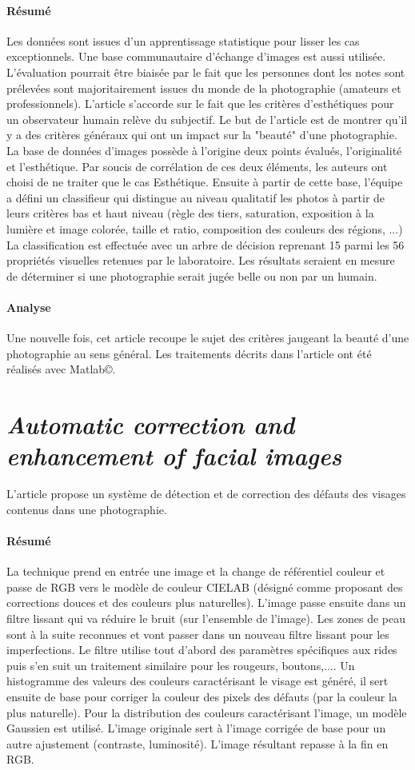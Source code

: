 \documentclass[11pt, french,screen]{report-rd-info}
\begin{document}
\paragraph{Résumé}
Les données sont issues d'un apprentissage statistique pour lisser les cas exceptionnels. Une base communautaire d'échange d'images est aussi utilisée. L'évaluation pourrait être biaisée par le fait que les personnes dont les notes sont prélevées sont majoritairement issues du monde de la photographie (amateurs et professionnels). L'article s'accorde sur le fait que les critères d'esthétiques pour un observateur humain relève du subjectif. Le but de l'article est de montrer qu'il y a des critères généraux qui ont un impact sur la "beauté" d'une photographie. La base de données d'images possède à l'origine deux points évalués, l'originalité et l'esthétique. Par soucis de corrélation de ces deux éléments, les auteurs ont choisi de ne traiter que le cas Esthétique.
Ensuite à partir de cette base, l'équipe a défini un classifieur qui distingue au niveau qualitatif les photos à partir de leurs critères bas et haut niveau (règle des tiers, saturation, exposition à la lumière et image colorée, taille et ratio, composition des couleurs des régions, ...)
La classification est effectuée avec un arbre de décision reprenant 15 parmi les 56 propriétés visuelles retenues par le laboratoire. Les résultats seraient en mesure de déterminer si une photographie serait jugée belle ou non par un humain.
\paragraph{Analyse}
Une nouvelle fois, cet article recoupe le sujet des critères jaugeant la beauté d'une photographie au sens général. Les traitements décrits dans l’article ont été réalisés avec Matlab\copyright.
\section{\emph{Automatic correction and enhancement of facial images}}
L'article \cite{Konoplev2012} propose un système de détection et de correction des défauts des visages contenus dans une photographie.
\paragraph{Résumé}
La technique prend en entrée une image et la change de référentiel couleur et passe de RGB vers le modèle de couleur CIELAB (désigné comme proposant des corrections douces et des couleurs plus naturelles). L'image passe ensuite dans un filtre lissant qui va réduire le bruit (sur l’ensemble de l’image). Les zones de peau sont à la suite reconnues et vont passer dans un nouveau filtre lissant pour les imperfections.
Le filtre utilise tout d'abord des paramètres spécifiques aux rides puis s'en suit un traitement similaire pour les rougeurs, boutons,.... Un histogramme des valeurs des couleurs caractérisant le visage est généré, il sert ensuite de base pour corriger la couleur des pixels des défauts (par la couleur la plus naturelle). Pour la distribution des couleurs caractérisant l'image, un modèle Gaussien est utilisé. L’image originale sert à l'image corrigée de base pour un autre ajustement (contraste, luminosité). L'image résultant repasse à la fin en RGB.
\end{document}
